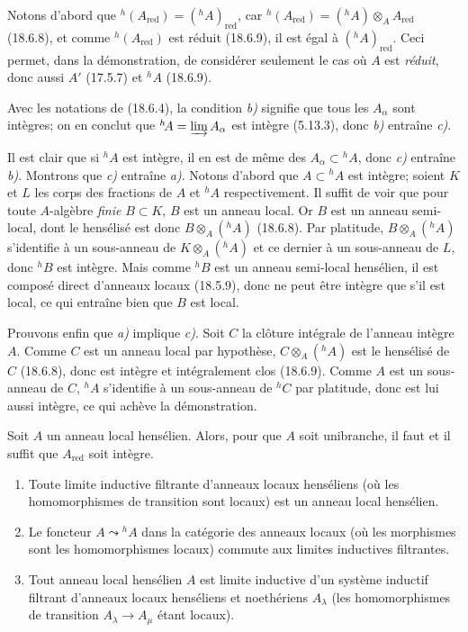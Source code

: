 Notons d'abord que ${}^h(A_{\mathrm{red}})=({}^h\!A)_{\mathrm{red}}$, car ${}^h(A_{\mathrm{red}})=({}^h\!A)\otimes_A A_{\mathrm{red}}$ (18.6.8), et comme ${}^h(A_{\mathrm{red}})$ est réduit (18.6.9), il est égal à $({}^h\!A)_{\mathrm{red}}$. Ceci permet, dans la démonstration, de considérer seulement le cas où $A$ est \emph{réduit}, donc aussi $A'$ (17.5.7) et ${}^h\!A$ (18.6.9).

Avec les notations de (18.6.4), la condition \emph{b)} signifie que tous les $A_\alpha$ sont intègres; on en conclut que ${}^h\!A=\varinjlim A_\alpha$ est intègre (5.13.3), donc \emph{b)} entraîne \emph{c)}.

Il est clair que si ${}^h\!A$ est intègre, il en est de même des $A_\alpha\subset{}^h\!A$, donc \emph{c)} entraîne \emph{b)}.
Montrons que \emph{c)} entraîne \emph{a)}. Notons d'abord que $A\subset{}^h\!A$ est intègre; soient $K$ et $L$ les corps des fractions de $A$ et ${}^h\!A$ respectivement. Il suffit de voir que pour toute $A$-algèbre \emph{finie} $B\subset K$, $B$ est un anneau local. Or $B$ est un anneau semi-local, dont le hensélisé est donc $B\otimes_A({}^h\!A)$ (18.6.8). Par platitude, $B\otimes_A({}^h\!A)$ s'identifie à un sous-anneau de $K\otimes_A({}^h\!A)$ et ce dernier à un sous-anneau de $L$, donc ${}^h\!B$ est intègre. Mais comme ${}^h\!B$ est un anneau semi-local hensélien, il est composé direct d'anneaux locaux (18.5.9), donc ne peut être intègre que s'il est local, ce qui entraîne bien que $B$ est local.

Prouvons enfin que \emph{a)} implique \emph{c)}. Soit $C$ la clôture intégrale de l'anneau intègre $A$. Comme $C$ est un anneau local par hypothèse, $C\otimes_A({}^h\!A)$ est le hensélisé de $C$ (18.6.8), donc est intègre et intégralement clos (18.6.9). Comme $A$ est un sous-anneau de $C$, ${}^h\!A$ s'identifie à un sous-anneau de ${}^h\!C$ par platitude, donc est lui aussi intègre, ce qui achève la démonstration.

\begin{corollary}[18.6.13]
\label{IV.18.6.13}
Soit $A$ un anneau local hensélien. Alors, pour que $A$ soit unibranche, il faut et il suffit que $A_{\mathrm{red}}$ soit intègre.
\end{corollary}

\begin{proposition}[18.6.14]
\label{IV.18.6.14}
\begin{enumerate}
  \item[\textup{(i)}] Toute limite inductive filtrante d'anneaux locaux henséliens (où les homomorphismes de transition sont locaux) est un anneau local hensélien.
  \item[\textup{(ii)}] Le foncteur $A\leadsto{}^h\!A$ dans la catégorie des anneaux locaux (où les morphismes sont les homomorphismes locaux) commute aux limites inductives filtrantes.
  \item[\textup{(iii)}] Tout anneau local hensélien $A$ est limite inductive d'un système inductif filtrant d'anneaux locaux henséliens et noethériens $A_\lambda$ (les homomorphismes de transition $A_\lambda\to A_\mu$ étant locaux).
\end{enumerate}
\end{proposition}

